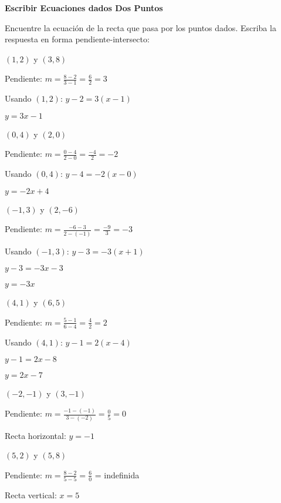 \begin{exercise}
\textbf{Escribir Ecuaciones dados Dos Puntos}

Encuentre la ecuación de la recta que pasa por los puntos dados. Escriba la respuesta en forma pendiente-intersecto:

\problem $(1, 2)$ y $(3, 8)$

\begin{solucion}
Pendiente: $m = \frac{8-2}{3-1} = \frac{6}{2} = 3$

Usando $(1, 2)$: $y - 2 = 3(x - 1)$

$y = 3x - 1$
\end{solucion}

\problem $(0, 4)$ y $(2, 0)$

\begin{solucion}
Pendiente: $m = \frac{0-4}{2-0} = \frac{-4}{2} = -2$

Usando $(0, 4)$: $y - 4 = -2(x - 0)$

$y = -2x + 4$
\end{solucion}

\problem $(-1, 3)$ y $(2, -6)$

\begin{solucion}
Pendiente: $m = \frac{-6-3}{2-(-1)} = \frac{-9}{3} = -3$

Usando $(-1, 3)$: $y - 3 = -3(x + 1)$

$y - 3 = -3x - 3$

$y = -3x$
\end{solucion}

\problem $(4, 1)$ y $(6, 5)$

\begin{solucion}
Pendiente: $m = \frac{5-1}{6-4} = \frac{4}{2} = 2$

Usando $(4, 1)$: $y - 1 = 2(x - 4)$

$y - 1 = 2x - 8$

$y = 2x - 7$
\end{solucion}

\problem $(-2, -1)$ y $(3, -1)$

\begin{solucion}
Pendiente: $m = \frac{-1-(-1)}{3-(-2)} = \frac{0}{5} = 0$

Recta horizontal: $y = -1$
\end{solucion}

\problem $(5, 2)$ y $(5, 8)$

\begin{solucion}
Pendiente: $m = \frac{8-2}{5-5} = \frac{6}{0}$ = indefinida

Recta vertical: $x = 5$
\end{solucion}
\end{exercise}

